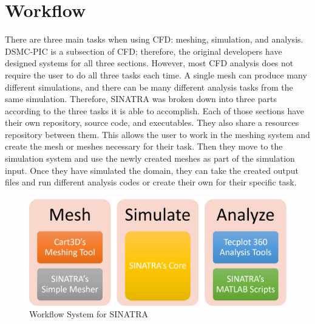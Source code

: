 \section{Workflow}
There are three main tasks when using CFD: meshing, simulation, and analysis. DSMC-PIC is a subsection of CFD; therefore, the original developers have designed systems for all three sections. However, most CFD analysis does not require the user to do all three tasks each time. A single mesh can produce many different simulations, and there can be many different analysis tasks from the same simulation. Therefore, SINATRA was broken down into three parts according to the three tasks it is able to accomplish. Each of those sections have their own repository, source code, and executables. They also share a resources repository between them. This allows the user to work in the meshing system and create the mesh or meshes necessary for their task. Then they move to the simulation system and use the newly created meshes as part of the simulation input. Once they have simulated the domain, they can take the created output files and run different analysis codes or create their own for their specific task.



\begin{figure}
\includegraphics[width=.95\textwidth]{figures/UserWorkFlow.png}
\centering
\caption{Workflow System for SINATRA}
\label{fig:UserWorkFlow}
\end{figure}

